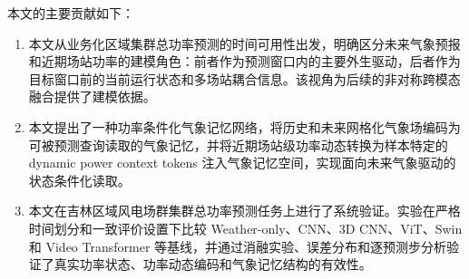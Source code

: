 本文的主要贡献如下：

\begin{enumerate}
\item 本文从业务化区域集群总功率预测的时间可用性出发，明确区分未来气象预报和近期场站功率的建模角色：前者作为预测窗口内的主要外生驱动，后者作为目标窗口前的当前运行状态和多场站耦合信息。该视角为后续的非对称跨模态融合提供了建模依据。
\item 本文提出了一种功率条件化气象记忆网络，将历史和未来网格化气象场编码为可被预测查询读取的气象记忆，并将近期场站级功率动态转换为样本特定的 dynamic power context tokens 注入气象记忆空间，实现面向未来气象驱动的状态条件化读取。
\item 本文在吉林区域风电场群集群总功率预测任务上进行了系统验证。实验在严格时间划分和一致评价设置下比较 Weather-only、CNN、3D CNN、ViT、Swin 和 Video Transformer 等基线，并通过消融实验、误差分布和逐预测步分析验证了真实功率状态、功率动态编码和气象记忆结构的有效性。
\end{enumerate}
